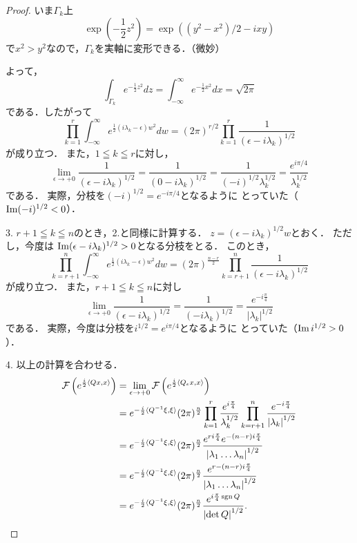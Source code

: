 \begin{proof}
  いま\(\Gamma_k\)上\[
    \exp\left(-\frac{1}{2}z^{2}\right)
    =
    \exp\left((y^2-x^2)/2-ixy\right)
  \]で\(x^2>y^2\)なので，\(\Gamma_k\)を実軸に変形できる．（微妙）

  よって，\[
    \int_{\Gamma_k}e^{-\frac{1}{2}z^{2}}dz
    =
    \int_{-\infty}^{\infty}e^{-\frac{1}{2}x^{2}}dx
    =\sqrt{2\pi}
  \]である．したがって
  \[
    \prod_{k=1}^{r}
    \int_{-\infty}^{\infty}
    e^{
      \frac{1}{2}(i\lambda_{k}-\epsilon)w^2
    }
    dw
    =
    (2\pi)^{r/2}
    \prod_{k=1}^{r}
    \frac{1}{(\epsilon-i\lambda_{k})^{1/2}}
  \]が成り立つ．
  また，\(1\leqq k\leqq r\)に対し，\[
    \lim_{\epsilon\to+0}
    \frac{1}{(\epsilon-i\lambda_{k})^{1/2}}
    =\frac{1}{(0-i\lambda_{k})^{1/2}}
    =\frac{1}{(-i)^{1/2}\lambda_{k}^{1/2}}
    =\frac{e^{i{\pi/4}}}{\lambda_{k}^{1/2}}
  \]である．
  実際，分枝を\((-i)^{1/2}=e^{-i{\pi/4}}\)となるように
  とっていた（\(\mathop{\mathrm{Im}}\nolimits(-i)^{1/2}<0\)）．

  3. 
  \(r+1\leqq k\leqq n\)のとき，2.と同様に計算する．
  \(z=(\epsilon-i\lambda_{k})^{1/2}w\)とおく．
  ただし，今度は
  \(\mathop{\mathrm{Im}}\nolimits(\epsilon-i\lambda_k)^{1/2}>0\)となる分枝をとる．
  このとき，
  \[
    \prod_{k=r+1}^{n}
    \int_{-\infty}^{\infty}
    e^{
      \frac{1}{2}(i\lambda_{k}-\epsilon)w^2
    }
    dw
    =
    (2\pi)^{\frac{n-r}{2}}
    \prod_{k=r+1}^{n}
    \frac{1}{(\epsilon-i\lambda_{k})^{1/2}}
  \]が成り立つ．
  また，\(r+1\leqq k\leqq n\)に対し
  \[
    \lim_{\epsilon\to+0}
    \frac{1}{(\epsilon-i\lambda_{k})^{1/2}}
    =\frac{1}{(-i\lambda_{k})^{1/2}}
    =\frac{e^{-i\frac{\pi}{4}}}{{\lvert\lambda_{k}\rvert}^{1/2}}
  \]である．
  実際，今度は分枝を\(i^{1/2}=e^{i{\pi/4}}\)となるように
  とっていた（\(\mathop{\mathrm{Im}}\nolimits i^{1/2}>0\)）．

  4. 
  以上の計算を合わせる．
  \begin{align*}
    \mathcal{F}\left(
      e^{\frac{i}{2}\langle{Qx,x}\rangle}
    \right)
    &=
    \lim_{\epsilon\to+0}
    \mathcal{F}\left(
      e^{\frac{i}{2}\langle{Q_{\epsilon}x,x}\rangle}
    \right)\\
    &=
    e^{-\frac{i}{2}\langle{Q^{-1}\xi,\xi}\rangle}
    (2\pi)^{\frac{n}{2}}
    \prod_{k=1}^{r}
    \frac{e^{i\frac{\pi}{4}}}{\lambda_{k}^{1/2}}
    \prod_{k=r+1}^{n}
    \frac{e^{-i\frac{\pi}{4}}}{{\lvert\lambda_{k}\rvert}^{1/2}}\\
    &=
    e^{-\frac{i}{2}\langle{Q^{-1}\xi,\xi}\rangle}
    (2\pi)^{\frac{n}{2}}
    \frac{
      e^{ri\frac{\pi}{4}}e^{-(n-r)i\frac{\pi}{4}}
    }{
      {\lvert\lambda_{1}\dots\lambda_{n}\rvert}^{1/2}
    }\\
    &=
    e^{-\frac{i}{2}\langle{Q^{-1}\xi,\xi}\rangle}
    (2\pi)^{\frac{n}{2}}
    \frac{
      e^{r-(n-r)i\frac{\pi}{4}}
    }{
      {\lvert\lambda_{1}\dots\lambda_{n}\rvert}^{1/2}
    }\\
    &=
    e^{-\frac{i}{2}\langle{Q^{-1}\xi,\xi}\rangle}
    (2\pi)^{\frac{n}{2}}
    \frac{
      e^{i\frac{\pi}{4}\mathop{\mathrm{sgn}}\nolimits{Q}}
    }{
      {\lvert\det{Q}\rvert}^{1/2}
    }.
  \end{align*}
\end{proof}


